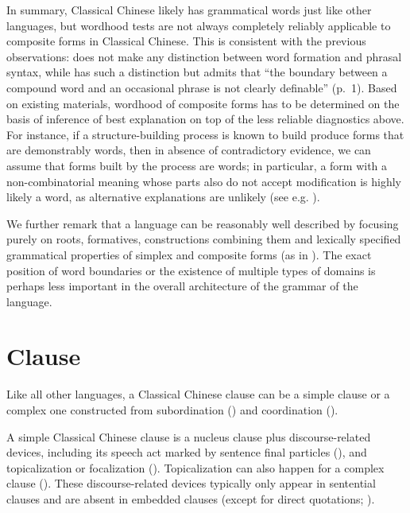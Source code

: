 \documentclass[UTF8, a4paper, oneside, scheme=plain, 12pt]{ctexrep}
\newcommand*{\citepage}[1]{p.~{#1}}
\begin{document}
In summary, Classical Chinese likely has grammatical words just like other languages,
but wordhood tests are not always completely reliably applicable to composite forms in Classical Chinese.
This is consistent with the previous observations:
\citet{pulleyblank1995outline} does not make any distinction between word formation and phrasal syntax,
while \citet{unger2019grammar} has such a distinction but admits that ``the boundary between a compound word and an occasional phrase is not clearly definable'' (\citepage{1}).
Based on existing materials, wordhood of composite forms has to be determined
on the basis of inference of best explanation on top of the less reliable diagnostics above.
For instance, if a structure-building process is known to build produce forms that are demonstrably words, then in absence of contradictory evidence, we can assume that forms built by the process are words;
in particular, a form with a non-combinatorial meaning whose parts also do not accept modification is highly likely a word,
as alternative explanations are unlikely
(see e.g. ).

We further remark that a language can be reasonably well described by focusing purely on roots, formatives, constructions combining them and lexically specified grammatical properties of simplex and composite forms (as in ).
The exact position of word boundaries or the existence of multiple types of domains is perhaps less important in the overall architecture of the grammar of the language.

\section{Clause}\label{sec:grammatical.clause}

Like all other languages, a Classical Chinese clause can be a simple clause
or a complex one constructed from subordination ()
and coordination ().

A simple Classical Chinese clause is a nucleus clause plus discourse-related devices,
including its speech act marked by sentence final particles (), 
and topicalization or focalization ().
Topicalization can also happen for a complex clause ().
These discourse-related devices typically only appear in sentential clauses and are absent in embedded clauses (except for direct quotations; ). 
\end{document}
